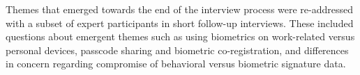 Themes that emerged towards the end of the interview process were re-addressed with a subset of expert participants in short follow-up interviews. These included questions about emergent themes such as using biometrics on work-related versus personal devices, passcode sharing and biometric co-registration, and differences in concern regarding compromise of behavioral versus biometric signature data. 

%

 


